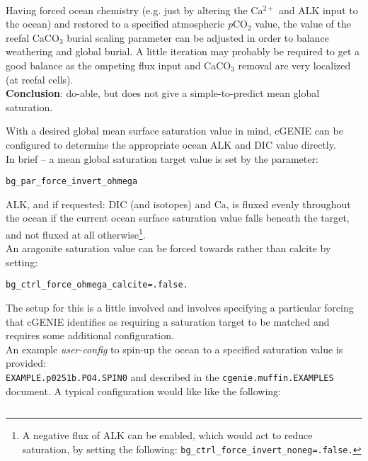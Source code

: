 \documentclass[10pt,twoside]{article}
\begin{document}
\begin{compactenum}
\\ Having forced ocean chemistry (e.g. just by altering the Ca\(^{2+}\) and ALK input to the ocean) and restored to a specified atmospheric \textit{p}CO\(_{2}\) value, the value of the reefal CaCO$_{3}$ burial scaling parameter can be adjusted in order to balance weathering and global burial. A little iteration may probably be required to get a good balance as the ompeting flux input and CaCO$_{3}$ removal are very localized (at reefal cells). 
\\ \textbf{Conclusion}: do-able, but does not give a simple-to-predict mean global saturation.

        \item With a desired global mean surface saturation value in mind, cGENIE can be configured to determine the appropriate ocean ALK and DIC value directly.
        \\ In brief -- a mean global saturation target value is set by the parameter:
\vspace{-5pt}\begin{verbatim}
bg_par_force_invert_ohmega
\end{verbatim}\vspace{-5pt}
ALK, and if requested: DIC (and isotopes) and Ca, is fluxed evenly throughout the ocean if the current ocean surface saturation value falls beneath the target, and not fluxed at all otherwise\footnote{A negative flux of ALK can be enabled, which would act to reduce saturation, by setting the following: \texttt{bg\_ctrl\_force\_invert\_noneg=.false.}}.
\\ An aragonite saturation value can be forced towards rather than calcite by setting: 
\vspace{-5pt}\begin{verbatim}
bg_ctrl_force_ohmega_calcite=.false.
\end{verbatim}\vspace{-5pt}
The setup for this is a little involved and involves specifying a particular forcing that cGENIE identifies as requiring a saturation target to be matched and requires some additional configuration.
\\ An example \textit{user-config} to spin-up the ocean to a specified saturation value is provided:
\\ \texttt{EXAMPLE.p0251b.PO4.SPIN0} and described in the \texttt{cgenie.muffin.EXAMPLES} document. A typical configuration would like like the following:
\vspace{-5pt}\small\begin{verbatim}

\end{verbatim}
\end{compactenum}
\end{document}
